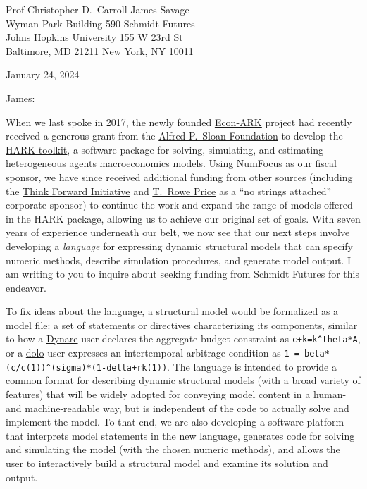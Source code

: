 \documentclass[11pt,pdftex,letterpaper]{article}
\begin{document}
	
\begin{singlespace}
	Prof Christopher D.\ Carroll \hfill James Savage\\
	Wyman Park Building 590 \hfill Schmidt Futures\\
	Johns Hopkins University \hfill 155 W 23rd St\\
	Baltimore, MD 21211 \hfill New York, NY 10011
	
	\vspace{0.2cm}
	
	January 24, 2024
	
\end{singlespace}

\vspace{0.3cm}

James:

When we last spoke in 2017, the newly founded \href{http://www.econ-ark.org}{Econ-ARK} project had recently received a generous grant from the \href{https://sloan.org}{Alfred P.\ Sloan Foundation} to develop the \href{https://github.com/econ-ark/HARK}{HARK toolkit}, a software package for solving, simulating, and estimating heterogeneous agents macroeconomics models. Using \href{https://numfocus.org/}{NumFocus} as our fiscal sponsor, we have since received additional funding from other sources (including the \href{https://inomics.com/institution/think-forward-initiative-1258337}{Think Forward Initiative} and \href{https://www.troweprice.com/en}{T.\ Rowe Price} as a ``no strings attached'' corporate sponsor) to continue the work and expand the range of models offered in the HARK package, allowing us to achieve our original set of goals. With seven years of experience underneath our belt, we now see that our next steps involve developing a \textit{language} for expressing dynamic structural models that can specify numeric methods, describe simulation procedures, and generate model output. I am writing to you to inquire about seeking funding from Schmidt Futures for this endeavor.

To fix ideas about the language, a structural model would be formalized as a model file: a set of statements or directives characterizing its components, similar to how a \href{https://www.dynare.org/}{Dynare} user declares the aggregate budget constraint as \texttt{c+k=k\^{}theta*A}, or a \href{https://www.econforge.org/dolo}{dolo} user expresses an intertemporal arbitrage condition as \texttt{1 = beta*(c/c(1))\^{}(sigma)*(1-delta+rk(1))}. The language is intended to provide a common format for describing dynamic structural models (with a broad variety of features) that will be widely adopted for conveying model content in a human- and machine-readable way, but is independent of the code to actually solve and implement the model. To that end, we are also developing a software platform that interprets model statements in the new language, generates code for solving and simulating the model (with the chosen numeric methods), and allows the user to interactively build a structural model and examine its solution and output.
\end{document}
